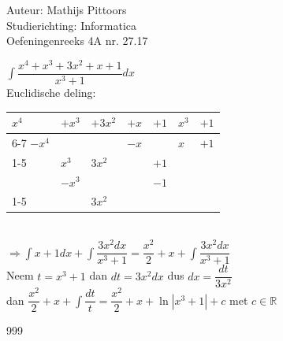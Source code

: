 \documentclass[a4paper]{article}
\newcommand{\intt}{\displaystyle\int}
\begin{document}
  
\noindent \large Auteur: Mathijs Pittoors \\
\noindent \large Studierichting: Informatica\\
\noindent \large Oefeningenreeks 4A nr. 27.17\\

\medskip

\normalsize

$\intt \dfrac{x^4 + x^3 + 3x^2 + x + 1}{x^3+1}dx$\\

Euclidische deling:\\


\begin{tabular}{lllll|ll}
$x^4$ & $+x^3$ & $+3x^2$ & $+x$ & $+1$ & $x^3$ & $+1$\\ \cline{6-7}
$-x^4$& & & $-x$ && $x$ & $+1$\\ \cline{1-5}
& $x^3$ & $3x^2$ & & $ +1$\\
& $-x^3$ & & & $ -1$\\ \cline{1-5}
& & $3x^2$ & &\\
\end{tabular}\\

$\Rightarrow \intt x + 1 dx + \int \dfrac{3x^2dx}{x^3 + 1} = \dfrac{x^2}{2} + x + \int \dfrac{3x^2dx}{x^3 + 1}$\\

Neem $t = x^3 + 1$ dan $dt = 3x^2 dx$ dus $dx = \dfrac{dt}{3x^2}$\\

dan $\dfrac{x^2}{2} + x + \intt \dfrac{dt}{t} = \dfrac{x^2}{2} + x + \ln |x^3 + 1| + c$ met $c \in \mathbb{R}$
\begin{thebibliography}{999}
\end{thebibliography}
\end{document}
